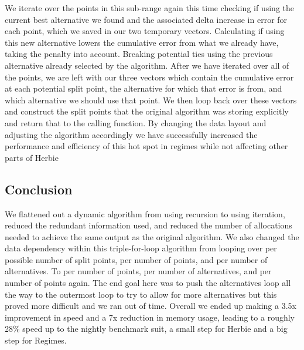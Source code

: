 \documentclass{article}
\begin{document}
We iterate over the points in this sub-range again this time checking if using the current best alternative we found and the associated delta increase in error for each point, which we saved in our two temporary vectors. Calculating if using this new alternative lowers the cumulative error from what we already have, taking the penalty into account. Breaking potential ties using the previous alternative already selected by the algorithm. After we have iterated over all of the points, we are left with our three vectors which contain the cumulative error at each potential split point, the alternative for which that error is from, and which alternative we should use that point. We then loop back over these vectors and construct the split points that the original algorithm was storing explicitly and return that to the calling function. By changing the data layout and adjusting the algorithm accordingly we have successfully increased the performance and efficiency of this hot spot in regimes while not affecting other parts of Herbie

\subsection{Conclusion}

We flattened out a dynamic algorithm from using recursion to using iteration, reduced the redundant information used, and reduced the number of allocations needed to achieve the same output as the original algorithm. We also changed the data dependency within this triple-for-loop algorithm from looping over per possible number of split points, per number of points, and per number of alternatives. To per number of points, per number of alternatives, and per number of points again. The end goal here was to push the alternatives loop all the way to the outermost loop to try to allow for more alternatives but this proved more difficult and we ran out of time. 
Overall we ended up making a 3.5x improvement in speed and a 7x reduction in memory usage, leading to a roughly 28\% speed up to the nightly benchmark suit, a small step for Herbie and a big step for Regimes.
 
\end{document}
